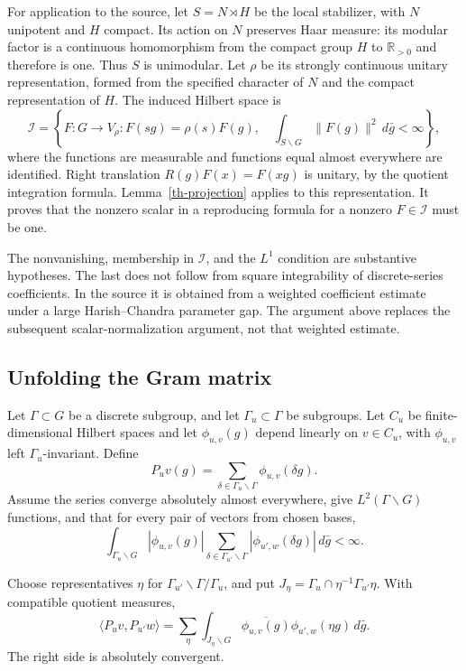 For application to the source, let $S=N\rtimes H$ be the local
stabilizer, with $N$ unipotent and $H$ compact.  Its action on $N$
preserves Haar measure: its modular factor is a continuous
homomorphism from the compact group $H$ to $\mathbb R_{>0}$ and
therefore is one.  Thus $S$ is unimodular.  Let $\rho$ be its strongly
continuous unitary representation, formed from the specified character of $N$ and
the compact representation of $H$.  The induced Hilbert space is
\[
 \mathcal I=\left\{F:G\to V_\rho:
 F(sg)=\rho(s)F(g),\quad
 \int_{S\backslash G}\|F(g)\|^2\,d\bar g<\infty\right\},
\]
where the functions are measurable and functions equal almost
everywhere are identified.  Right
translation $R(g)F(x)=F(xg)$ is unitary, by the quotient integration
formula.  Lemma~\ref{th-projection} applies to this representation.
It proves that the nonzero scalar in a reproducing formula for a
nonzero $F\in\mathcal I$ must be one.

The nonvanishing, membership in $\mathcal I$, and the $L^1$ condition
are substantive hypotheses.  The last does not follow from square
integrability of discrete-series coefficients.  In the source it is
obtained from a weighted coefficient estimate under a large
Harish--Chandra parameter gap.  The argument above replaces the
subsequent scalar-normalization argument, not that weighted estimate.

\subsection{Unfolding the Gram matrix}

Let $\Gamma\subset G$ be a discrete subgroup, and let
$\Gamma_u\subset\Gamma$ be subgroups.  Let $C_u$ be finite-dimensional
Hilbert spaces and let $\phi_{u,v}(g)$ depend linearly on $v\in C_u$,
with $\phi_{u,v}$ left $\Gamma_u$-invariant.  Define
\[
 P_uv(g)=\sum_{\delta\in\Gamma_u\backslash\Gamma}
                         \phi_{u,v}(\delta g).
\]
Assume the series converge absolutely almost everywhere, give
$L^2(\Gamma\backslash G)$ functions, and that for every pair of
vectors from chosen bases,
\begin{equation}\label{th-unfold-integrable}
 \int_{\Gamma_u\backslash G}|\phi_{u,v}(g)|
     \sum_{\delta\in\Gamma_{u'}\backslash\Gamma}
                  |\phi_{u',w}(\delta g)|\,d\bar g<\infty.
\end{equation}

\begin{lemma}\label{th-unfold}
Choose representatives $\eta$ for
$\Gamma_{u'}\backslash\Gamma/\Gamma_u$, and put
$J_\eta=\Gamma_u\cap\eta^{-1}\Gamma_{u'}\eta$.
With compatible quotient measures,
\begin{equation}\label{th-unfold-formula}
 \langle P_uv,P_{u'}w\rangle
 =\sum_\eta\int_{J_\eta\backslash G}
       \overline{\phi_{u,v}(g)}\phi_{u',w}(\eta g)\,d\bar g.
\end{equation}
The right side is absolutely convergent.
\end{lemma}

